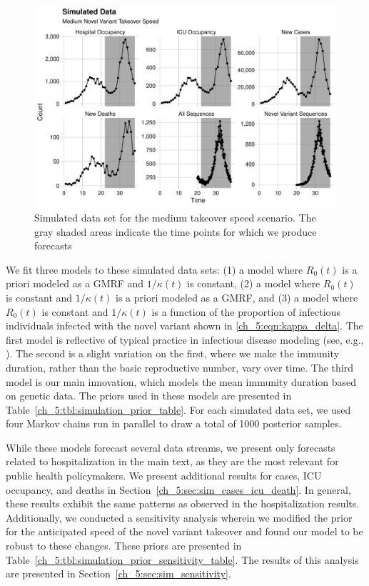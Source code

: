 \begin{figure}
    \centering
    \includegraphics[width=1.0\columnwidth]{simulated_binned_data_medium_plot}
    \caption[Simulated data set for the medium takeover speed scenario.]{Simulated data set for the medium takeover speed scenario.
    The gray shaded areas indicate the time points for which we produce forecasts}
    \label{ch_5:fig:simulated_binned_data_medium_plot}
\end{figure}

We fit three models to these simulated data sets: (1) a model where \( R_0(t) \) is a priori modeled as a GMRF and \( 1 / \kappa(t) \) is constant, (2) a model where \( R_0(t) \) is constant and \( 1 / \kappa(t) \) is a priori modeled as a GMRF, and (3) a model where \( R_0(t) \) is constant and \( 1 / \kappa(t) \) is a function of the proportion of infectious individuals infected with the novel variant shown in \eqref{ch_5:eqn:kappa_delta}.
The first model is reflective of typical practice in infectious disease modeling (see, e.g., \citep{Gibson2020real, ODea2021semi}).
The second is a slight variation on the first, where we make the immunity duration, rather than the basic reproductive number, vary over time.
The third model is our main innovation, which models the mean immunity duration based on genetic data.
The priors used in these models are presented in Table~\ref{ch_5:tbl:simulation_prior_table}.
For each simulated data set, we used four Markov chains run in parallel to draw a total of 1000 posterior samples.

While these models forecast several data streams, we present only forecasts related to hospitalization in the main text, as they are the most relevant for public health policymakers.
We present additional results for cases, ICU occupancy, and deaths in Section~\ref{ch_5:sec:sim_cases_icu_death}.
In general, these results exhibit the same patterns as observed in the hospitalization results.
Additionally, we conducted a sensitivity analysis wherein we modified the prior for the anticipated speed of the novel variant takeover and found our model to be robust to these changes.
These priors are presented in Table~\ref{ch_5:tbl:simulation_prior_sensitivity_table}.
The results of this analysis are presented in Section~\ref{ch_5:sec:sim_sensitivity}.

